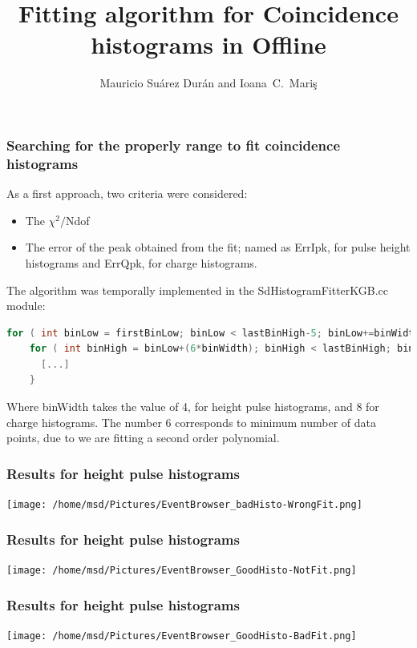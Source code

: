 \documentclass[aspectratio=169]{beamer}
\title{Fitting algorithm for Coincidence histograms in Offline}
\author{
  Mauricio Su\'arez Dur\'an and Ioana~C.~Mari\c{s}
}
\institute{IIHE-ULB}
\begin{document}
\begin{frame}
  \titlepage
\end{frame}

\begin{frame}[fragile]
  \frametitle{Searching for the properly range to fit coincidence
  histograms}
  As a first approach, two criteria were considered:
  \vspace{0.5cm}
  \begin{itemize}
    \item The $\chi^2/$Ndof     
    \item The error of the peak obtained from the fit; named
      as ErrIpk, for pulse height histograms and ErrQpk, for
      charge histograms.
  \end{itemize}
  \vspace{1.0cm}

  The algorithm was temporally implemented in the
  SdHistogramFitterKGB.cc module:
  \begin{lstlisting}[language=C++, basicstyle = \ttfamily\tiny]
  for ( int binLow = firstBinLow; binLow < lastBinHigh-5; binLow+=binWidth )
    for ( int binHigh = binLow+(6*binWidth); binHigh < lastBinHigh; binHigh+=binWidth ) {
      [...]
    }
  \end{lstlisting}
  Where binWidth takes the value of 4, for height pulse
  histograms, and 8 for charge histograms. The number 6
  corresponds to minimum number of data points, due to we are
  fitting a second order polynomial.
\end{frame}


\begin{frame}
  \frametitle{Results for height pulse histograms}

  \begin{center}
    \texttt{[image: /home/msd/Pictures/EventBrowser\_badHisto-WrongFit.png]}
  \end{center}
\end{frame}


\begin{frame}
  \frametitle{Results for height pulse histograms}

  \begin{center}
    \texttt{[image: /home/msd/Pictures/EventBrowser\_GoodHisto-NotFit.png]}
  \end{center}
\end{frame}


\begin{frame}
  \frametitle{Results for height pulse histograms}

  \begin{center}
    \texttt{[image: /home/msd/Pictures/EventBrowser\_GoodHisto-BadFit.png]}
  \end{center}

\end{frame}
\end{document}
